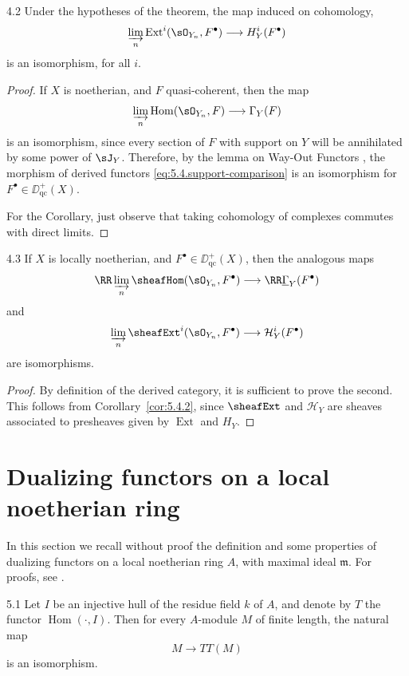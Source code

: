 \begin{bookcorollary}{4.2}\label{cor:5.4.2}
Under the hypotheses of the theorem, the map induced on cohomology,
\[
\varinjlim_n \operatorname{Ext}^{i}(\sO_{Y_{n}}, F^{\bullet})\longrightarrow H_{Y}^{i}(F^{\bullet})
\]
is an isomorphism, for all $i$.
\end{bookcorollary}

\begin{proof}
If $X$ is noetherian, and $F$ quasi-coherent, then the map
\[
\varinjlim_n\operatorname{Hom}(\sO_{Y_{n}}, F)\longrightarrow \Gamma_{Y}(F)
\]
is an isomorphism, since every section of $F$ with support on $Y$ will be annihilated by some power of $\sJ_Y$. Therefore, by the lemma on Way-Out Functors , the morphism of derived functors \eqref{eq:5.4.support-comparison} is an isomorphism for $F^\bullet\in\DD^+_{\mathrm{qc}}(X)$.

For the Corollary, just observe that taking cohomology of complexes commutes with direct limits.
\end{proof}

\begin{bookcorollary}{4.3}\label{cor:5.4.3}
If $X$ is locally noetherian, and $F^\bullet\in\DD^+_{\mathrm{qc}}(X)$, then the analogous maps
\[
\RR\varinjlim_n \sheafHom(\sO_{Y_n}, F^\bullet)\longrightarrow \RR\underline{\Gamma}_{Y}(F^\bullet)
\]
and
\[
\varinjlim_n \sheafExt^{i}(\sO_{Y_{n}}, F^{\bullet})\longrightarrow \mathcal{H}_{Y}^{i}(F^{\bullet})
\]
are isomorphisms.
\end{bookcorollary}

\begin{proof}
By definition of the derived category, it is sufficient to prove the second. This follows from Corollary~\ref{cor:5.4.2}, since $\sheafExt$ and $\mathcal{H}_{Y}$ are sheaves associated to presheaves given by $\operatorname{Ext}$ and $H_{Y}$.
\end{proof}

\section{Dualizing functors on a local noetherian ring}\label{sec:5.5}

In this section we recall without proof the definition and some properties of dualizing functors on a local noetherian ring $A$, with maximal ideal $\mathfrak{m}$. For proofs, see \cite[\nopp \S4]{LC}.

\begin{bookproposition}{5.1}\label{prop:5.5.1}
Let $I$ be an injective hull of the residue field $k$ of $A$, and denote by $T$ the functor $\operatorname{Hom}(\cdot,I)$. Then for every $A$-module $M$ of finite length, the natural map
\[
M\longrightarrow T T(M)
\]
is an isomorphism.
\end{bookproposition}

